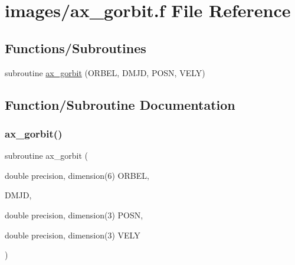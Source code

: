 \hypertarget{ax__gorbit_8f}{}\section{images/ax\+\_\+gorbit.f File Reference}
\label{ax__gorbit_8f}
\subsection*{Functions/\+Subroutines}
\begin{DoxyCompactItemize}
\item 
subroutine \hyperlink{ax__gorbit_8f_acec1524f0cbd5ba024423387799244c3}{ax\+\_\+gorbit} (O\+R\+B\+EL, D\+M\+JD, P\+O\+SN, V\+E\+LY)
\end{DoxyCompactItemize}


\subsection{Function/\+Subroutine Documentation}
\mbox{\label{ax__gorbit_8f_acec1524f0cbd5ba024423387799244c3}} 
\subsubsection{\texorpdfstring{ax\+\_\+gorbit()}{ax\_gorbit()}}
{\footnotesize\ttfamily subroutine ax\+\_\+gorbit (\begin{DoxyParamCaption}\item[{double precision, dimension(6)}]{O\+R\+B\+EL,  }\item[{}]{D\+M\+JD,  }\item[{double precision, dimension(3)}]{P\+O\+SN,  }\item[{double precision, dimension(3)}]{V\+E\+LY }\end{DoxyParamCaption})}

